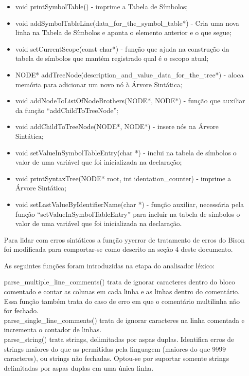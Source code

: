 \documentclass[12pt]{article}
\begin{document}
\begin{itemize}
	\item void printSymbolTable() - imprime a Tabela de Símbolos;
    \item void addSymbolTableLine(data\_for\_the\_symbol\_table*) - Cria uma nova linha na Tabela de Símbolos e aponta o elemento anterior e o que segue;
    \item void setCurrentScope(const char*) - função que ajuda na construção da tabela de símbolos que mantém registrado qual é o escopo atual;
    \item NODE* addTreeNode(description\_and\_value\_data\_for\_the\_tree*) - aloca memória para adicionar um novo nó à Árvore Sintática;
    \item void addNodeToListOfNodeBrothers(NODE*, NODE*) - função que auxiliar da função ``addChildToTreeNode'';
    \item void addChildToTreeNode(NODE*, NODE*) - insere nós na Árvore Sintática;
    \item void setValueInSymbolTableEntry(char *) - inclui na tabela de símbolos o valor de uma variável que foi inicializada na declaração;
	\item void printSyntaxTree(NODE* root, int identation\_counter) - imprime a Árvore Sintática;
	\item void setLastValueByIdentifierName(char *) - função auxiliar, necessária pela função ``setValueInSymbolTableEntry'' para incluir na tabela de símbolos o valor de uma variável que foi inicializada na declaração.\\
\end{itemize}

Para lidar com erros sintáticos a função yyerror de tratamento de erros do Bison foi modificada para comportar-se como descrito na seção 4 deste documento.

As seguintes funções foram introduzidas na etapa do analisador léxico:

parse\_multiple\_line\_comments() trata de ignorar caracteres dentro do bloco comentado e contar as colunas em cada linha e as linhas dentro do comentário. Essa função também trata do caso de erro em que o comentário multilinha não for fechado.\\

parse\_single\_line\_comments() trata de ignorar caracteres na linha comentada e incrementa o contador de linhas.\\

parse\_string() trata strings, delimitadas por aspas duplas. Identifica erros de strings maiores do que as permitidas pela linguagem (maiores do que 9999 caracteres), ou strings não fechadas. Optou-se por suportar somente strings delimitadas por aspas duplas em uma única linha.
\end{document}
